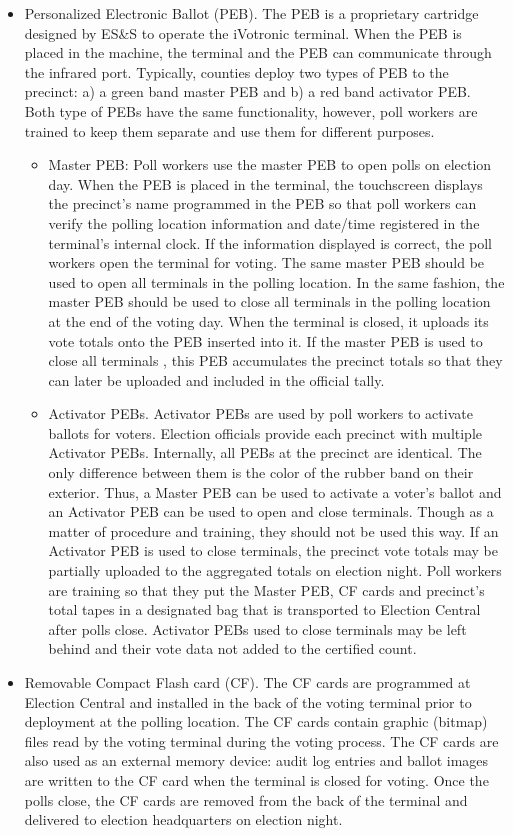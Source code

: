 \begin{itemize}
\item Personalized Electronic Ballot (PEB). The PEB is a proprietary cartridge designed by ES\&S to operate the iVotronic terminal.  When the PEB is placed in the machine, the terminal and the PEB can communicate through the infrared port.  Typically, counties deploy two types of PEB to the precinct: a) a green band master PEB and b) a red band activator PEB. Both type of PEBs have the same functionality, however, poll workers are trained to keep them separate and use them for different purposes.
    \begin{itemize}
    \item Master PEB:  Poll workers use the master PEB to open polls on election day. When the PEB is placed in the terminal, the touchscreen displays the precinct's name programmed in the PEB so that poll workers can verify the polling location information and date/time registered in the terminal's internal clock. If the information displayed is correct, the poll workers open the terminal for voting. The same master PEB should be used to open all terminals in the polling location. In the same fashion, the master PEB should be used to close all terminals in the polling location at the end of the voting day. When the terminal is closed, it uploads its vote totals onto the PEB inserted into it. If the master PEB is used to close all terminals , this PEB accumulates the precinct totals so that they can later be uploaded and included in the official tally.
    \item Activator PEBs.  Activator PEBs are used by  poll workers to activate ballots for voters. Election officials provide each precinct with multiple Activator PEBs. Internally, all PEBs at the precinct are identical. The only difference between them is the color of the rubber band on their exterior. Thus, a Master PEB can be used to activate a voter's ballot and an Activator PEB can be used to open and close terminals. Though as a matter of procedure and training, they should not be used this way. If an Activator PEB is used to close terminals, the precinct vote totals may be partially uploaded to the aggregated totals on election night. Poll workers are training so that they put the Master PEB, CF cards and precinct's total tapes in a designated bag that is transported to Election Central after polls close.  Activator PEBs used to close terminals may be left behind and their vote data not added to the certified count.
    \end{itemize}
\item Removable Compact Flash card (CF). The CF cards are programmed at Election Central and installed in the back of the voting terminal prior to deployment at the polling location. The CF cards contain graphic (bitmap) files read by the voting terminal during the voting process. The CF cards are also used as an external memory device: audit log entries and ballot images are written to the CF card when the terminal is closed for voting. Once the polls close, the CF cards are removed from the back of the terminal and delivered to election headquarters on election night. 


\end{itemize}

